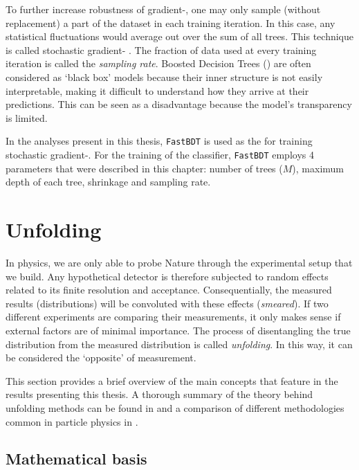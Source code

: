 To further increase robustness of gradient-, one may only sample (without replacement) a part of the dataset in each training iteration.
In this case, any statistical fluctuations would average out over the sum of all trees. 
This technique is called stochastic gradient- \cite{FRIEDMAN2002367}.
The fraction of data used at every training iteration is called the \textit{sampling rate}.
Boosted Decision Trees () are often considered as `black box' models because their inner structure is
not easily interpretable, making it difficult to understand how they arrive at their predictions. 
This can be seen as a disadvantage because the model's transparency is limited.

In the analyses present in this thesis, \texttt{FastBDT} \cite{Keck:2017gsv} is used as the \MVA for training stochastic gradient-.
For the training of the classifier, \texttt{FastBDT} employs 4 parameters that were described in this chapter: number of trees ($M$), maximum depth of each tree, shrinkage and sampling rate. 

\section{Unfolding}\label{sec:unfolding}

In physics, we are only able to probe Nature through the experimental setup that we build.
Any hypothetical detector is therefore subjected to random effects related to its finite resolution and acceptance.
Consequentially, the measured results (distributions) will be convoluted with these effects (\textit{smeared}).
If two different experiments are comparing their measurements, it only makes sense if external factors are of minimal importance.
The process of disentangling the true distribution from the measured distribution is called \textit{unfolding}.
In this way, it can be considered the `opposite' of measurement.

This section provides a brief overview of the main concepts that feature in the results presenting this thesis.
A thorough summary of the theory behind unfolding methods can be found in \cite{Behnke:2013pga,Blobel_Lohrmann_1998} and a comparison of different methodologies common in particle physics in \cite{Schmitt:2016orm,Cowan:2002in,Brenner:2019lmf}.

\subsection{Mathematical basis}

